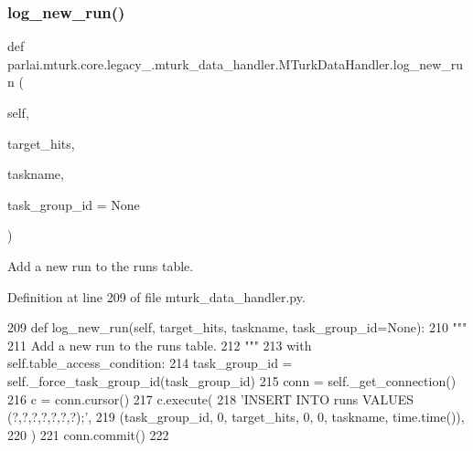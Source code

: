 \subsubsection{\texorpdfstring{log\+\_\+new\+\_\+run()}{log\_new\_run()}}
{\footnotesize\ttfamily def parlai.\+mturk.\+core.\+legacy\+\_.\+mturk\+\_\+data\+\_\+handler.\+M\+Turk\+Data\+Handler.\+log\+\_\+new\+\_\+run (\begin{DoxyParamCaption}\item[{}]{self,  }\item[{}]{target\+\_\+hits,  }\item[{}]{taskname,  }\item[{}]{task\+\_\+group\+\_\+id = {\ttfamily None} }\end{DoxyParamCaption})}

\begin{DoxyVerb}Add a new run to the runs table.
\end{DoxyVerb}
 

Definition at line 209 of file mturk\+\_\+data\+\_\+handler.\+py.


\begin{DoxyCode}
209     \textcolor{keyword}{def }log\_new\_run(self, target\_hits, taskname, task\_group\_id=None):
210         \textcolor{stringliteral}{"""}
211 \textcolor{stringliteral}{        Add a new run to the runs table.}
212 \textcolor{stringliteral}{        """}
213         with self.table\_access\_condition:
214             task\_group\_id = self.\_force\_task\_group\_id(task\_group\_id)
215             conn = self.\_get\_connection()
216             c = conn.cursor()
217             c.execute(
218                 \textcolor{stringliteral}{'INSERT INTO runs VALUES (?,?,?,?,?,?,?);'},
219                 (task\_group\_id, 0, target\_hits, 0, 0, taskname, time.time()),
220             )
221             conn.commit()
222 
\end{DoxyCode}
\mbox{\label{classparlai_1_1mturk_1_1core_1_1legacy__2018_1_1mturk__data__handler_1_1MTurkDataHandler_a86266f696dc415742c4d1709568a52ff}} 
